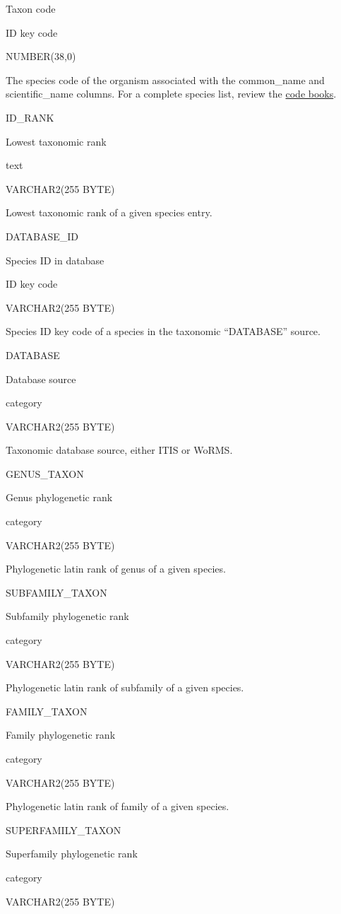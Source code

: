 \documentclass[
  letterpaper,
  oneside,
  open=any]{scrbook}
\begin{document}
Taxon code

ID key code

NUMBER(38,0)

The species code of the organism associated with the common\_name and
scientific\_name columns. For a complete species list, review the
\href{https://www.fisheries.noaa.gov/resource/document/groundfish-survey-species-code-manual-and-data-codes-manual}{code
books}.

ID\_RANK

Lowest taxonomic rank

text

VARCHAR2(255 BYTE)

Lowest taxonomic rank of a given species entry.

DATABASE\_ID

Species ID in database

ID key code

VARCHAR2(255 BYTE)

Species ID key code of a species in the taxonomic ``DATABASE'' source.

DATABASE

Database source

category

VARCHAR2(255 BYTE)

Taxonomic database source, either ITIS or WoRMS.

GENUS\_TAXON

Genus phylogenetic rank

category

VARCHAR2(255 BYTE)

Phylogenetic latin rank of genus of a given species.

SUBFAMILY\_TAXON

Subfamily phylogenetic rank

category

VARCHAR2(255 BYTE)

Phylogenetic latin rank of subfamily of a given species.

FAMILY\_TAXON

Family phylogenetic rank

category

VARCHAR2(255 BYTE)

Phylogenetic latin rank of family of a given species.

SUPERFAMILY\_TAXON

Superfamily phylogenetic rank

category

VARCHAR2(255 BYTE)
\end{document}
